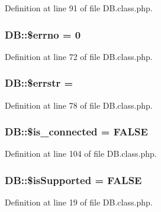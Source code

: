 Definition at line 91 of file D\+B.\+class.\+php.

\subsubsection[{\texorpdfstring{\$errno}{$errno}}]{\setlength{\rightskip}{0pt plus 5cm}D\+B\+::\$errno = 0}\hypertarget{classDB_af99d759f7fb3bbadd579d72e686d1cf1}{}\label{classDB_af99d759f7fb3bbadd579d72e686d1cf1}


Definition at line 72 of file D\+B.\+class.\+php.

\subsubsection[{\texorpdfstring{\$errstr}{$errstr}}]{\setlength{\rightskip}{0pt plus 5cm}D\+B\+::\$errstr = \textquotesingle{}\textquotesingle{}}\hypertarget{classDB_ae006f35821aba99713b834fa6a69e55b}{}\label{classDB_ae006f35821aba99713b834fa6a69e55b}


Definition at line 78 of file D\+B.\+class.\+php.

\subsubsection[{\texorpdfstring{\$is\+\_\+connected}{$is_connected}}]{\setlength{\rightskip}{0pt plus 5cm}D\+B\+::\$is\+\_\+connected = F\+A\+L\+SE}\hypertarget{classDB_aac22b6ebcd8f78c2f70646d381f933dc}{}\label{classDB_aac22b6ebcd8f78c2f70646d381f933dc}


Definition at line 104 of file D\+B.\+class.\+php.

\subsubsection[{\texorpdfstring{\$is\+Supported}{$isSupported}}]{\setlength{\rightskip}{0pt plus 5cm}D\+B\+::\$is\+Supported = F\+A\+L\+SE\hspace{0.3cm}{\ttfamily [static]}}\hypertarget{classDB_a6b693edbdcdce5c86f42c050f62d8136}{}\label{classDB_a6b693edbdcdce5c86f42c050f62d8136}


Definition at line 19 of file D\+B.\+class.\+php.

